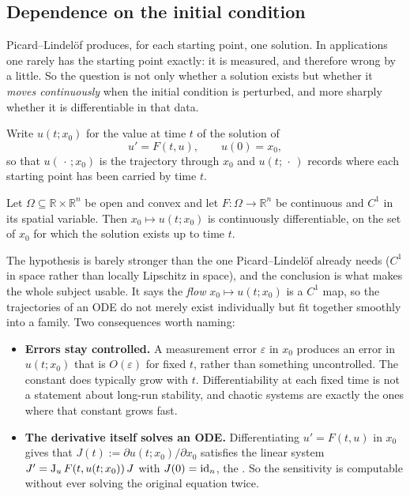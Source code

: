 \subsection{Dependence on the initial condition}
\label{sec:dependence_on_initial_conditions}

Picard--Lindelöf produces, for each starting point, one solution. In applications one rarely has
the starting point exactly: it is measured, and therefore wrong by a little. So the question is
not only whether a solution exists but whether it \emph{moves continuously} when the initial
condition is perturbed, and more sharply whether it is differentiable in that data.

Write $u(t;x_0)$ for the value at time $t$ of the solution of
\[u' = F(t,u), \qquad u(0) = x_0,\]
so that $u(\,\cdot\,;x_0)$ is the trajectory through $x_0$ and $u(t;\,\cdot\,)$ records where
each starting point has been carried by time $t$.

\begin{theorem}
\label{thm:differentiability_initial_conditions}
Let $\Omega \subseteq \mathbb{R}\times\mathbb{R}^n$ be open and convex and let
$F : \Omega \to \mathbb{R}^n$ be continuous and $C^1$ in its spatial variable. Then
$x_0 \mapsto u(t;x_0)$ is continuously differentiable, on the set of $x_0$ for which the solution
exists up to time $t$.
\end{theorem}

\begin{remark}
The hypothesis is barely stronger than the one Picard--Lindelöf already needs ($C^1$ in space
rather than locally Lipschitz in space), and the conclusion is what makes the whole subject
usable. It says the \emph{flow} $x_0 \mapsto u(t;x_0)$ is a $C^1$ map, so the trajectories of an
ODE do not merely exist individually but fit together smoothly into a family. Two consequences
worth naming:
\begin{itemize}
  \item \textbf{Errors stay controlled.} A measurement error $\varepsilon$ in $x_0$ produces an
    error in $u(t;x_0)$ that is $O(\varepsilon)$ for fixed $t$, rather than something
    uncontrolled. The constant does typically grow with $t$. Differentiability at each fixed
    time is not a statement about long-run stability, and chaotic systems are exactly the ones
    where that constant grows fast.
  \item \textbf{The derivative itself solves an ODE.} Differentiating $u' = F(t,u)$ in $x_0$
    gives that $J(t) := \partial u(t;x_0)/\partial x_0$ satisfies the linear system
    $J' = \operatorname{J}_uF(t,u(t;x_0))\,J$ with $J(0) = \operatorname{id}_n$, the . So the
    sensitivity is computable without ever solving the original equation twice.
\end{itemize}
\end{remark}

